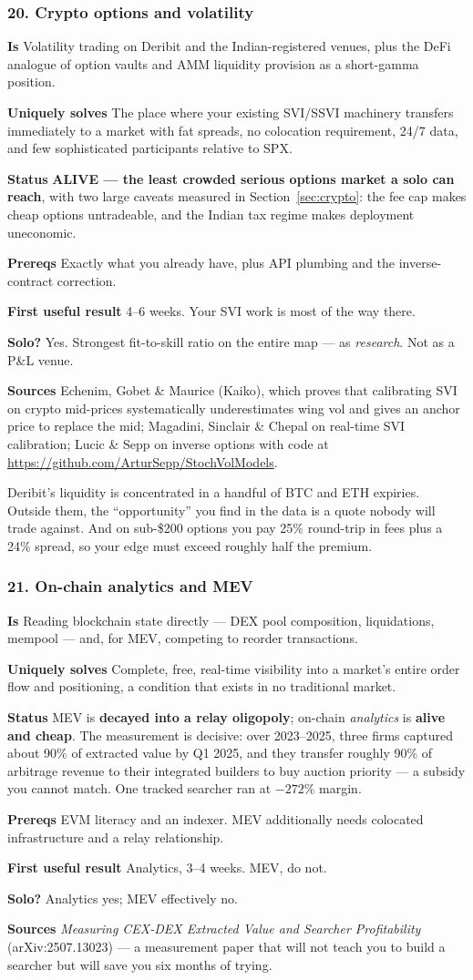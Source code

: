 \documentclass[11pt,a4paper]{article}
\newcommand{\alv}[1]{\textcolor{alive}{\textbf{#1}}}
\newcommand{\dec}[1]{\textcolor{decayed}{\textbf{#1}}}
\newcommand{\fitem}[1]{\par\smallskip\noindent\textbf{#1} }
\begin{document}
\subsubsection{20. Crypto options and volatility}
\fitem{Is}Volatility trading on Deribit and the Indian-registered venues, plus
the DeFi analogue of option vaults and AMM liquidity provision as a short-gamma
position.
\fitem{Uniquely solves}The place where your existing SVI/SSVI machinery transfers
immediately to a market with fat spreads, no colocation requirement, 24/7 data,
and few sophisticated participants relative to SPX.
\fitem{Status}\alv{ALIVE --- the least crowded serious options market a solo can
reach}, with two large caveats measured in Section~\ref{sec:crypto}: the fee cap
makes cheap options untradeable, and the Indian tax regime makes deployment
uneconomic.
\fitem{Prereqs}Exactly what you already have, plus API plumbing and the
inverse-contract correction.
\fitem{First useful result}4--6 weeks. Your SVI work is most of the way there.
\fitem{Solo?}Yes. Strongest fit-to-skill ratio on the entire map --- as
\emph{research}. Not as a P\&L venue.
\fitem{Sources}Echenim, Gobet \& Maurice (Kaiko), which proves that calibrating
SVI on crypto mid-prices systematically underestimates wing vol and gives an
anchor price to replace the mid; Magadini, Sinclair \& Chepal on real-time SVI
calibration; Lucic \& Sepp on inverse options with code at
\url{https://github.com/ArturSepp/StochVolModels}.

\begin{waste}
Deribit's liquidity is concentrated in a handful of BTC and ETH expiries. Outside
them, the ``opportunity'' you find in the data is a quote nobody will trade
against. And on sub-\$200 options you pay 25\% round-trip in fees plus a 24\%
spread, so your edge must exceed roughly half the premium.
\end{waste}

\subsubsection{21. On-chain analytics and MEV}
\fitem{Is}Reading blockchain state directly --- DEX pool composition,
liquidations, mempool --- and, for MEV, competing to reorder transactions.
\fitem{Uniquely solves}Complete, free, real-time visibility into a market's
entire order flow and positioning, a condition that exists in no traditional market.
\fitem{Status}MEV is \dec{decayed into a relay oligopoly}; on-chain
\emph{analytics} is \alv{alive and cheap}. The measurement is decisive: over
2023--2025, three firms captured about 90\% of extracted value by Q1 2025, and
they transfer roughly 90\% of arbitrage revenue to their integrated builders to
buy auction priority --- a subsidy you cannot match. One tracked searcher ran at
$-272\%$ margin.
\fitem{Prereqs}EVM literacy and an indexer. MEV additionally needs colocated
infrastructure and a relay relationship.
\fitem{First useful result}Analytics, 3--4 weeks. MEV, do not.
\fitem{Solo?}Analytics yes; MEV effectively no.
\fitem{Sources}\emph{Measuring CEX-DEX Extracted Value and Searcher
Profitability} (arXiv:2507.13023) --- a measurement paper that will not teach you
to build a searcher but will save you six months of trying.
\end{document}
